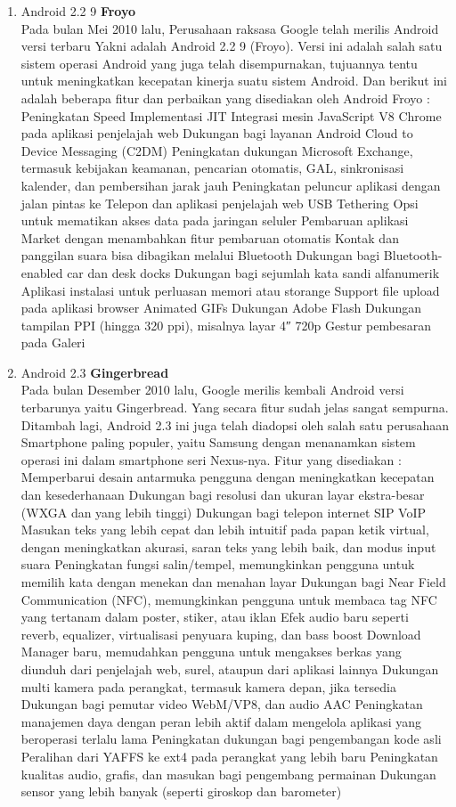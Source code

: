 \begin{enumerate}
\item Android 2.2 9 \textbf{Froyo}\\
Pada bulan Mei 2010 lalu, Perusahaan raksasa Google telah merilis Android versi terbaru Yakni adalah Android 2.2 9 (Froyo). Versi ini adalah salah satu sistem operasi Android yang juga telah disempurnakan, tujuannya tentu untuk meningkatkan kecepatan kinerja suatu sistem Android. Dan berikut ini adalah beberapa fitur dan perbaikan yang disediakan oleh Android Froyo :
Peningkatan Speed
Implementasi JIT
Integrasi mesin JavaScript V8 Chrome pada aplikasi penjelajah web
Dukungan bagi layanan Android Cloud to Device Messaging (C2DM)
Peningkatan dukungan Microsoft Exchange, termasuk kebijakan keamanan, pencarian otomatis, GAL, sinkronisasi kalender, dan pembersihan jarak jauh
Peningkatan peluncur aplikasi dengan jalan pintas ke Telepon dan aplikasi penjelajah web
USB Tethering
Opsi untuk mematikan akses data pada jaringan seluler
Pembaruan aplikasi Market dengan menambahkan fitur pembaruan otomatis
Kontak dan panggilan suara bisa dibagikan melalui Bluetooth
Dukungan bagi Bluetooth-enabled car dan desk docks
Dukungan bagi sejumlah kata sandi alfanumerik
Aplikasi instalasi untuk perluasan memori atau storange
Support file upload pada aplikasi browser
Animated GIFs
Dukungan Adobe Flash
Dukungan tampilan PPI (hingga 320 ppi), misalnya layar 4″ 720p
Gestur pembesaran pada Galeri

\item Android 2.3 \textbf{Gingerbread}\\
Pada bulan Desember 2010 lalu, Google merilis kembali Android versi terbarunya yaitu Gingerbread. Yang secara fitur sudah jelas sangat sempurna. Ditambah lagi, Android 2.3 ini juga telah diadopsi oleh salah satu perusahaan Smartphone paling populer, yaitu Samsung dengan menanamkan sistem operasi ini dalam smartphone seri Nexus-nya. Fitur yang disediakan : 
Memperbarui desain antarmuka pengguna dengan meningkatkan kecepatan dan kesederhanaan
Dukungan bagi resolusi dan ukuran layar ekstra-besar (WXGA dan yang lebih tinggi)
Dukungan bagi telepon internet SIP VoIP
Masukan teks yang lebih cepat dan lebih intuitif pada papan ketik virtual, dengan meningkatkan akurasi, saran teks yang lebih baik, dan modus input suara
Peningkatan fungsi salin/tempel, memungkinkan pengguna untuk memilih kata dengan menekan dan menahan layar
Dukungan bagi Near Field Communication (NFC), memungkinkan pengguna untuk membaca tag NFC yang tertanam dalam poster, stiker, atau iklan
Efek audio baru seperti reverb, equalizer, virtualisasi penyuara kuping, dan bass boost
Download Manager baru, memudahkan pengguna untuk mengakses berkas yang diunduh dari penjelajah web, surel, ataupun dari aplikasi lainnya
Dukungan multi kamera pada perangkat, termasuk kamera depan, jika tersedia
Dukungan bagi pemutar video WebM/VP8, dan audio AAC
Peningkatan manajemen daya dengan peran lebih aktif dalam mengelola aplikasi yang beroperasi terlalu lama
Peningkatan dukungan bagi pengembangan kode asli
Peralihan dari YAFFS ke ext4 pada perangkat yang lebih baru
Peningkatan kualitas audio, grafis, dan masukan bagi pengembang permainan
Dukungan sensor yang lebih banyak (seperti giroskop dan barometer)


\end{enumerate}
